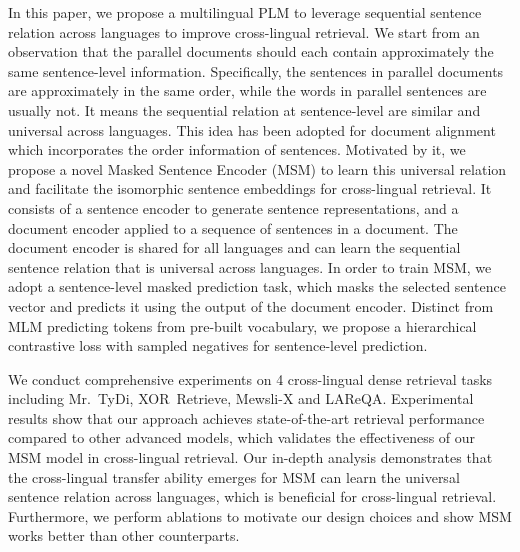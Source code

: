 \documentclass{article} %
\newcommand{\tydi}{Mr.~TyDi\xspace}
\newcommand{\xor}{XOR~Retrieve\xspace}
\begin{document}
In this paper, we propose a multilingual PLM to leverage sequential sentence relation across languages to improve cross-lingual retrieval. 
We start from an observation that the parallel documents should each contain approximately the same sentence-level information. Specifically, the sentences in parallel documents are approximately in the same order, while the words in parallel sentences are usually not. It means the sequential relation at sentence-level are similar and universal across languages. 
This idea has been adopted for document alignment~\citep{thompson-koehn-2020-exploiting, resnik-1998-parallel} which incorporates the order information of sentences.
Motivated by it, we propose a novel Masked Sentence Encoder (MSM) to learn this universal relation and facilitate the isomorphic sentence embeddings for cross-lingual retrieval.
It consists of a sentence encoder to generate sentence representations, and a document encoder applied to a sequence of sentences in a document. The document encoder is shared for all languages and can learn the sequential sentence relation that is universal across languages.
In order to train MSM, we adopt a sentence-level masked prediction task, which masks the selected sentence vector and predicts it using the output of the document encoder. Distinct from MLM predicting tokens from pre-built vocabulary, we propose a hierarchical contrastive loss with sampled negatives for sentence-level prediction.



We conduct comprehensive experiments on 4 cross-lingual dense retrieval tasks including \tydi, \xor, Mewsli-X and LAReQA. Experimental results show that our approach achieves state-of-the-art retrieval performance compared to other advanced models, which validates the effectiveness of our MSM model in cross-lingual retrieval. 
Our in-depth analysis demonstrates that the cross-lingual transfer ability emerges for MSM can learn the universal sentence relation across languages, which is beneficial for cross-lingual retrieval. Furthermore, we perform ablations to motivate our design choices and show MSM works better than other counterparts. 
\end{document}
